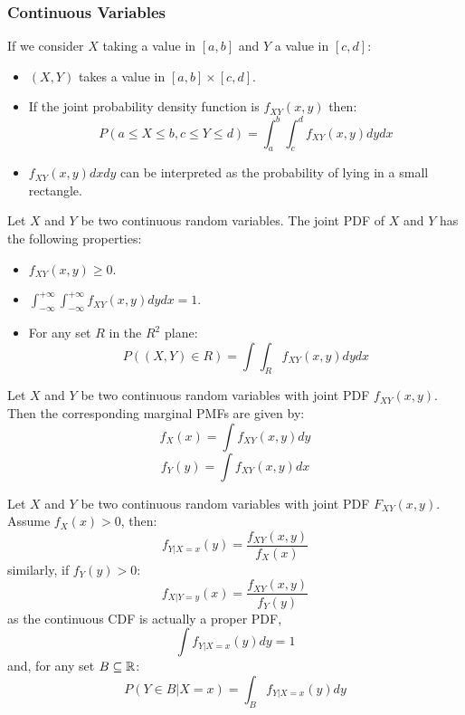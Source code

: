 \subsubsection{Continuous Variables}

If we consider \(X\) taking a value in \([a,b]\) and \(Y\) a value in \([c,d]\):
\begin{itemize}
    \item \((X,Y)\) takes a value in \([a,b] \times [c,d]\).
    \item If the joint probability density function is \(f_{XY}(x,y)\) then:
        \begin{equation}
            P(a \leq X \leq b, c \leq Y \leq d) = \int^b_a \int^d_c f_{XY}(x,y) dydx
        \end{equation}
    \item \(f_{XY}(x,y) dxdy\) can be interpreted as the probability of lying in a small rectangle.
\end{itemize}

Let \(X\) and \(Y\) be two continuous random variables.
The joint PDF of \(X\) and \(Y\) has the following properties:
\begin{itemize}
    \item \(f_{XY}(x,y) \geq 0\).
    \item \(\int^{+\infty}_{-\infty}\int^{+\infty}_{-\infty} f_{XY}(x,y) dydx = 1\).
    \item For any set \(R\) in the \(R^2\) plane:
        \begin{equation}
            P((X,Y) \in R) = \int\int_R f_{XY}(x,y) dydx
        \end{equation}
\end{itemize}

Let \(X\) and \(Y\) be two continuous random variables with joint PDF \(f_{XY}(x,y)\).
Then the corresponding marginal PMFs are given by:
\begin{equation}
    f_X(x) = \int f_{XY}(x,y) dy
\end{equation}
\begin{equation}
    f_Y(y) = \int f_{XY}(x,y) dx
\end{equation}

Let \(X\) and \(Y\) be two continuous random variables with joint PDF \(F_{XY}(x,y)\).
Assume \(f_X(x) > 0\), then:
\begin{equation}
    f_{Y|X=x}(y) = \frac{f_{XY}(x,y)}{f_X(x)}
\end{equation}
similarly, if \(f_Y(y) > 0\):
\begin{equation}
    f_{X|Y=y}(x) = \frac{f_{XY}(x,y)}{f_Y(y)}
\end{equation}
as the continuous CDF is actually a proper PDF,
\begin{equation}
    \int f_{Y | X=x} (y) dy = 1
\end{equation}
and, for any set \(B \subseteq \mathbb{R}\):
\begin{equation}
    P(Y \in B | X = x) = \int_B f_{Y|X=x} (y) dy
\end{equation}

